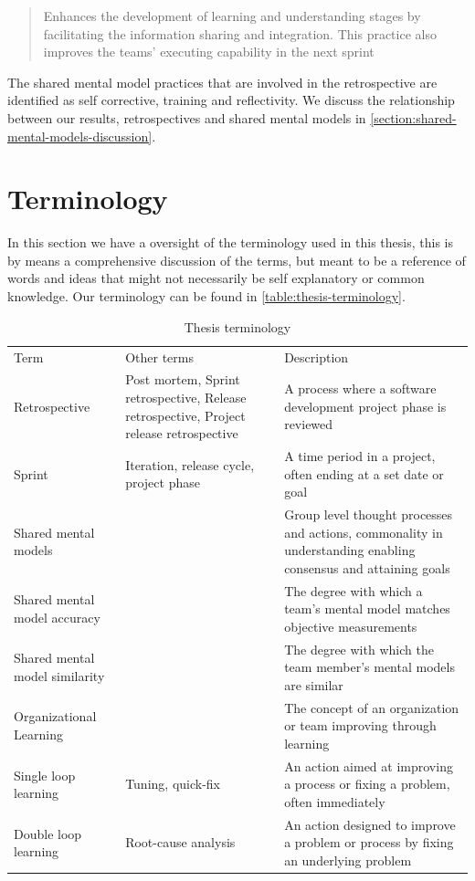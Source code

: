 \begin{quote}
Enhances the development of learning and understanding stages by facilitating the information sharing and integration. This practice also improves the teams’ executing capability in the next sprint
\end{quote}

The shared mental model practices that are involved in the retrospective are identified as self corrective, training and reflectivity. We discuss the relationship between our results, retrospectives and shared mental models in \autoref{section:shared-mental-models-discussion}.

\clearpage 

\section{Terminology}
In this section we have a oversight of the terminology used in this thesis, this is by means a comprehensive discussion of the terms, but meant to be a reference of words and ideas that might not necessarily be self explanatory or common knowledge. Our terminology can be found in \autoref{table:thesis-terminology}.

\begin{table}
	\begin{centering}
		\label{table:thesis-terminology}
		\caption{Thesis terminology}
		\begin{tabular}{ p{}| p{} | p{}}
			\hline
			Term & Other terms & Description \\
			Retrospective & Post mortem, Sprint retrospective, Release retrospective, Project release retrospective & A process where a software development project phase is reviewed \\
			Sprint & Iteration, release cycle, project phase & A time period in a project, often ending at a set date or goal \\
			Shared mental models & & Group level thought processes and actions, commonality in understanding enabling consensus and attaining goals \\
			Shared mental model accuracy & & The degree with which a team's mental model matches objective measurements \\
			Shared mental model similarity & & The degree with which the team member's mental models are similar \\
			Organizational Learning & & The concept of an organization or team improving through learning \\
			Single loop learning & Tuning, quick-fix & An action aimed at improving a process or fixing a problem, often immediately \\
			Double loop learning & Root-cause analysis & An action designed to improve a problem or process by fixing an underlying problem \\

			\hline
		\end{tabular}
	\end{centering}
\end{table}





\clearpage

